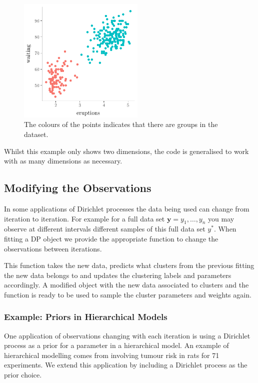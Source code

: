 \documentclass[nojss]{jss}
\begin{document}
\begin{figure}[tb]
  \centering
	\includegraphics[height=60mm, width=60mm]{img/faithful_multi_plot.pdf}
	\caption{The colours of the points indicates that there are groups in the  dataset.}
	\label{fig:clustering}
\end{figure}
Whilst this example only shows two dimensions, the code is generalised to work with as many dimensions as necessary.


\subsection{Modifying the Observations}
In some applications of Dirichlet processes the data being used can change from iteration to iteration. For example for a full data set $\mathbf{y} = y_1 , \ldots , y_n$ you may observe at different intervals different samples of this full data set $y^*$. When fitting a DP object we provide the appropriate function  to change the observations between iterations.

This function takes the new data, predicts what clusters from the previous fitting the new data belongs to and updates the clustering labels and parameters accordingly. A modified object with the new data associated to clusters and the function  is ready to be used to sample the cluster parameters and weights again.

\subsubsection{Example: Priors in Hierarchical Models}
One application of observations changing with each iteration is using a Dirichlet process as a prior for a parameter in a hierarchical model. An example of hierarchical modelling comes from \cite{gelman_bayesian_2014} involving tumour risk in rats for 71 experiments. We extend this application by including a Dirichlet process as the prior choice.
\end{document}
